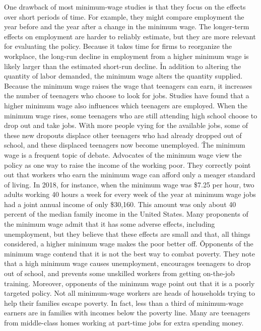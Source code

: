 One drawback of most minimum-wage studies is that they focus on the effects over short periods of time. For example,
they might compare employment the year before and the year after a change in the minimum wage. The longer-term
effects on employment are harder to reliably estimate, but they are more relevant for evaluating the policy. Because
it takes time for firms to reorganize the workplace, the long-run decline in employment from a higher minimum wage is
likely larger than the estimated short-run decline. \v

In addition to altering the quantity of labor demanded, the minimum wage alters the quantity supplied. Because the
minimum wage raises the wage that teenagers can earn, it increases the number of teenagers who choose to look for
jobs. Studies have found that a higher minimum wage also influences which teenagers are employed. When the minimum
wage rises, some teenagers who are still attending high school choose to drop out and take jobs. With more people
vying for the available jobs, some of these new dropouts displace other teenagers who had already dropped out of
school, and these displaced teenagers now become unemployed. \v

The minimum wage is a frequent topic of debate. Advocates of the minimum wage view the policy as one way to raise the
income of the working poor. They correctly point out that workers who earn the minimum wage can afford only a meager
standard of living. In 2018, for instance, when the minimum wage was \$7.25 per hour, two adults working 40 hours a
week for every week of the year at minimum wage jobs had a joint annual income of only \$30,160. This amount was only
about 40 percent of the median family income in the United States. Many proponents of the minimum wage admit that it
has some adverse effects, including unemployment, but they believe that these effects are small and that, all things
considered, a higher minimum wage makes the poor better off. \v

Opponents of the minimum wage contend that it is not the best way to combat poverty. They note that a high minimum
wage causes unemployment, encourages teenagers to drop out of school, and prevents some unskilled workers from
getting on-the-job training. Moreover, opponents of the minimum wage point out that it is a poorly targeted policy.
Not all minimum-wage workers are heads of households trying to help their families escape poverty. In fact, less than
a third of minimum-wage earners are in families with incomes below the poverty line. Many are teenagers from
middle-class homes working at part-time jobs for extra spending money.

